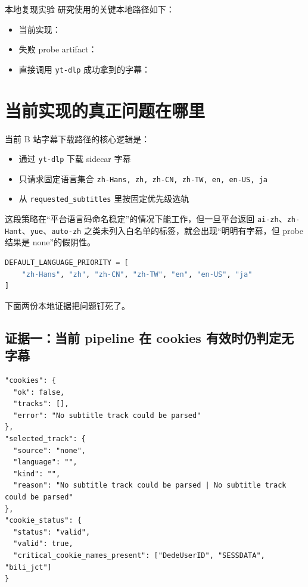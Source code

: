 \documentclass[a4paper]{article}
\begin{document}
\begin{evidencebox}{本地复现实验}
研究使用的关键本地路径如下：
\begin{itemize}
\item 当前实现：
\item 失败 probe artifact：
\item 直接调用 \texttt{yt-dlp} 成功拿到的字幕：
\end{itemize}
\end{evidencebox}

\section{当前实现的真正问题在哪里}

当前 B 站字幕下载路径的核心逻辑是：
\begin{itemize}
\item 通过 \texttt{yt-dlp} 下载 sidecar 字幕
\item 只请求固定语言集合 \texttt{zh-Hans, zh, zh-CN, zh-TW, en, en-US, ja}
\item 从 \texttt{requested\_subtitles} 里按固定优先级选轨
\end{itemize}

这段策略在“平台语言码命名稳定”的情况下能工作，但一旦平台返回 \texttt{ai-zh}、\texttt{zh-Hant}、\texttt{yue}、\texttt{auto-zh} 之类未列入白名单的标签，就会出现“明明有字幕，但 probe 结果是 none”的假阴性。

\begin{lstlisting}[language=Python,caption={当前实现中的固定语言优先级，摘自本地 adapter}]
DEFAULT_LANGUAGE_PRIORITY = [
    "zh-Hans", "zh", "zh-CN", "zh-TW", "en", "en-US", "ja"
]
\end{lstlisting}

下面两份本地证据把问题钉死了。

\subsection{证据一：当前 pipeline 在 cookies 有效时仍判定无字幕}

\begin{lstlisting}[language={},caption={本地失败 probe 结果的关键字段，来源 L2}]
"cookies": {
  "ok": false,
  "tracks": [],
  "error": "No subtitle track could be parsed"
},
"selected_track": {
  "source": "none",
  "language": "",
  "kind": "",
  "reason": "No subtitle track could be parsed | No subtitle track could be parsed"
},
"cookie_status": {
  "status": "valid",
  "valid": true,
  "critical_cookie_names_present": ["DedeUserID", "SESSDATA", "bili_jct"]
}
\end{lstlisting}
\end{document}
